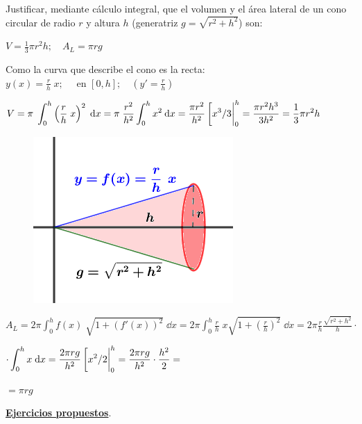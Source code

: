 \begin{ejre}
\label{cono}
	Justificar, mediante cálculo integral, que el volumen y el área lateral de un cono circular de radio $r$ y altura $h$ (generatriz $g=\sqrt{r^2+h^2}$) son: 
	
	\hspace{15mm} $V=\frac 1 3 \pi r^2 h; \quad A_L= \pi r g$
\end{ejre}
\begin{proofw}\renewcommand{\qedsymbol}{$\diamond$}	


		
Como la curva que describe el cono es la recta: $y(x)=\frac r h \; x ; \quad \text{ en } [0,h]; \quad \left(y'=\frac r h  \right)$

$V=\displaystyle \pi\; \int_0^h \left( \frac r h \; x\right)^2 \; \dd x = \pi\;\frac {r^2}{h^2} \int_0^h x^2 \: \dd x = \dfrac {\pi r^2}{h^2} \eval[x^3/3|_0^h= \dfrac {\pi r^2 h^3}{3 h^2}=\frac 1 3 \pi r^2 h$
\begin{multicols}{2}
	\begin{figure}[H]
		\centering
		\includegraphics[width=.35\textwidth]{imagenes/imagenes08/T08IM30.png}
	\end{figure}


$A_L=2\pi \displaystyle \int_0^h f(x)\; \sqrt{1+(f'(x))^2}\; \dd x = 2 \pi \int_0^h \frac r h \; x \sqrt{1+\left(\frac r h \right)^2}\; \dd x= 2\pi \frac r h \frac {\sqrt{r^2+h^2}} h\cdot  $

$\displaystyle \cdot \int_0^h x \; \dd x = \dfrac {2 \pi r g}{h^2} \eval [x^2/2|_0^h= \dfrac {2 \pi r g}{h^2} \cdot \dfrac {h^2}{2}=$

$= \pi r g$
\end{multicols}
\end{proofw}




\textbf{\underline{Ejercicios propuestos}}.

